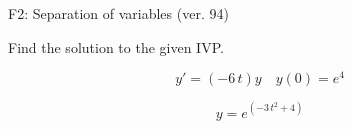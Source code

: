 \begin{exercise}
  \begin{exerciseTitle}F2: Separation of variables (ver. 94)\end{exerciseTitle}
  \begin{exerciseStatement}
    
Find the solution to the given IVP.

    
\[y'=( -6 \, t )y\hspace{1em} y(0)= e^{4}\]

  \end{exerciseStatement}
  \begin{exerciseAnswer}
    
\[y= e^{\left(-3 \, t^{2} + 4\right)}\]

  \end{exerciseAnswer}
\end{exercise}